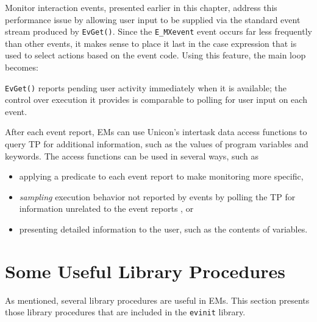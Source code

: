 Monitor interaction events, presented earlier in this chapter,
address this performance issue by allowing user input to be supplied
via the standard event stream produced by {\tt EvGet()}.
Since the {\tt E\_MXevent} event occurs far less
frequently than other events, it makes sense to place it last in the
case expression that is used to select actions based on the event
code.  Using this feature, the main loop becomes: 

 
{\tt EvGet()} reports pending user activity immediately when it is
available; the control over execution it provides is comparable to
polling for user input on each event.

After each event report, EMs can use Unicon's intertask data access
functions to query TP for additional information, such as the values
of program variables and keywords.  The access functions can be used
in several ways, such as

\begin{itemize}
\item applying a predicate to each event report to make monitoring
	more specific,
\item {\em sampling\/} execution behavior not reported by events by
	polling the TP for information unrelated to the event reports
	\cite{Ogle90}, or 
\item presenting detailed information to the user, such as the
	contents of variables.
\end{itemize}


\section{Some Useful Library Procedures}

As mentioned, several library procedures are useful
in EMs.  This section presents those library procedures that are
included in the {\tt evinit\/} library.

